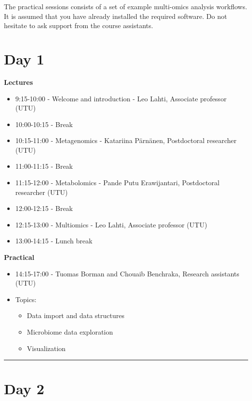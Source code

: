 \documentclass[
  oneside]{book}
\begin{document}
The practical sessions consists of a set of example
multi-omics analysis workflows. It is assumed that you
have already installed the required software. Do not hesitate to ask
support from the course assistants.

\hypertarget{day-1}{%
\section{Day 1}\label{day-1}}

\textbf{Lectures}

\begin{itemize}
\item
  9:15-10:00 - Welcome and introduction - Leo Lahti, Associate professor (UTU)
\item
  10:00-10:15 - Break
\item
  10:15-11:00 - Metagenomics - Katariina Pärnänen, Postdoctoral researcher (UTU)
\item
  11:00-11:15 - Break
\item
  11:15-12:00 - Metabolomics - Pande Putu Erawijantari, Postdoctoral researcher (UTU)
\item
  12:00-12:15 - Break
\item
  12:15-13:00 - Multiomics - Leo Lahti, Associate professor (UTU)
\item
  13:00-14:15 - Lunch break
\end{itemize}

\textbf{Practical}

\begin{itemize}
\item
  14:15-17:00 - Tuomas Borman and Chouaib Benchraka, Research assistants (UTU)
\item
  Topics:

  \begin{itemize}
  \item
    Data import and data structures
  \item
    Microbiome data exploration
  \item
    Visualization
  \end{itemize}
\end{itemize}

\begin{center}\rule{0.5\linewidth}{0.5pt}\end{center}

\hypertarget{day-2}{%
\section{Day 2}\label{day-2}}
\end{document}
